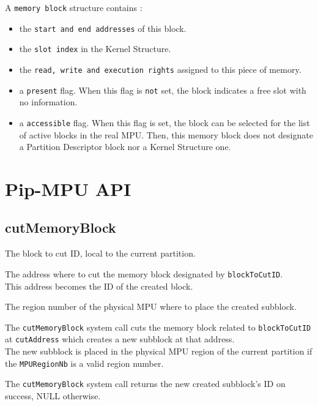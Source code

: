\documentclass[10pt,a4paper,titlepage]{refart}
\begin{document}
A \texttt{memory block} structure contains :
\begin{itemize}
    \item the \texttt{start and end addresses} of this block.
    \item the \texttt{slot index} in the Kernel Structure.
	\item the \texttt{read, write and execution rights} assigned to this piece of memory.
	\item a \texttt{present} flag. When this flag is \texttt{not} set, the block indicates a free slot with no information.
	\item a \texttt{accessible} flag. When this flag is set, the block can be selected for the list of active blocks in the real MPU.
	Then, this memory block does not designate a Partition Descriptor block nor a Kernel Structure one.
\end{itemize}

\section{Pip-MPU API}

\subsection{cutMemoryBlock}
The block to cut ID, local to the current partition.

The address where to cut the memory block designated by \texttt{blockToCutID}.\\
This address becomes the ID of the created block.

The region number of the physical MPU where to place the created subblock.

\medskip
The \texttt{cutMemoryBlock} system call cuts the memory block related to \texttt{blockToCutID} at \texttt{cutAddress} which creates a new subblock at that address.\\
The new subblock is placed in the physical MPU region of the current partition if the \texttt{MPURegionNb} is a valid region number.

The \texttt{cutMemoryBlock} system call returns the new created subblock's ID on success, NULL otherwise.
\end{document}

